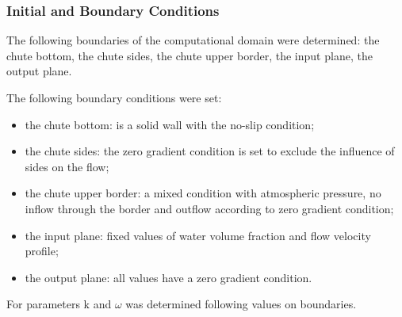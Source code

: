 \documentclass[sensors,article,submit,moreauthors,pdftex]{Definitions/mdpi}
\begin{document}
\subsubsection{Initial and Boundary Conditions}

The following boundaries of the computational domain were determined: the chute bottom, the chute sides, the chute upper border, the input plane, the output plane.

The following boundary conditions were set:

\begin{itemize}
    \item the chute bottom: is a solid wall with the no-slip condition;
    \item the chute sides: the zero gradient condition is set to exclude the     influence of sides on the flow;
    \item the chute upper border: a mixed condition with atmospheric pressure,     no inflow through the border and outflow according to zero gradient     condition;
    \item the input plane: fixed values of water volume fraction and flow velocity profile;
    \item the output plane: all values have a zero gradient condition.
\end{itemize}

For parameters k and $\omega$ was determined following values on boundaries.
\end{document}
